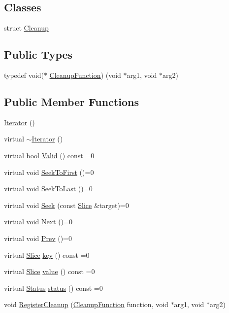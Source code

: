 \subsection*{Classes}
\begin{DoxyCompactItemize}
\item 
struct \hyperlink{structleveldb_1_1_iterator_1_1_cleanup}{Cleanup}
\end{DoxyCompactItemize}
\subsection*{Public Types}
\begin{DoxyCompactItemize}
\item 
typedef void($\ast$ \hyperlink{classleveldb_1_1_iterator_ae40c9eedd82a722d24fde1fd8bee4afa}{Cleanup\+Function}) (void $\ast$arg1, void $\ast$arg2)
\end{DoxyCompactItemize}
\subsection*{Public Member Functions}
\begin{DoxyCompactItemize}
\item 
\hyperlink{classleveldb_1_1_iterator_a1dc1cbc893e55a3fc990f08cf191480a}{Iterator} ()
\item 
virtual \hyperlink{classleveldb_1_1_iterator_a2c9ce32aa57b2202d1e0d4a38c2676a1}{$\sim$\+Iterator} ()
\item 
virtual bool \hyperlink{classleveldb_1_1_iterator_a38614978bfa0586327b8e237bcb46012}{Valid} () const =0
\item 
virtual void \hyperlink{classleveldb_1_1_iterator_a3594967cf26ddf1d37c7b886bb48627e}{Seek\+To\+First} ()=0
\item 
virtual void \hyperlink{classleveldb_1_1_iterator_a8ad637f0a759e6d94cca6c5b4db440d3}{Seek\+To\+Last} ()=0
\item 
virtual void \hyperlink{classleveldb_1_1_iterator_a97a556e97ded60c677fbf4de7321ec44}{Seek} (const \hyperlink{classleveldb_1_1_slice}{Slice} \&target)=0
\item 
virtual void \hyperlink{classleveldb_1_1_iterator_aea54a5ca7eb942eb15770820529410e7}{Next} ()=0
\item 
virtual void \hyperlink{classleveldb_1_1_iterator_a28798d802a203788587dc6adc5bc729e}{Prev} ()=0
\item 
virtual \hyperlink{classleveldb_1_1_slice}{Slice} \hyperlink{classleveldb_1_1_iterator_ad17feced6e24a1b21db5ae6940c1f220}{key} () const =0
\item 
virtual \hyperlink{classleveldb_1_1_slice}{Slice} \hyperlink{classleveldb_1_1_iterator_a613ac2e965518aad7a064c64c72bcf7c}{value} () const =0
\item 
virtual \hyperlink{classleveldb_1_1_status}{Status} \hyperlink{classleveldb_1_1_iterator_ac84f34623a031b7eeb23409320f76376}{status} () const =0
\item 
void \hyperlink{classleveldb_1_1_iterator_a8c0281f9e4a2c9dceb37aad8128b636f}{Register\+Cleanup} (\hyperlink{classleveldb_1_1_iterator_ae40c9eedd82a722d24fde1fd8bee4afa}{Cleanup\+Function} function, void $\ast$arg1, void $\ast$arg2)
\end{DoxyCompactItemize}
